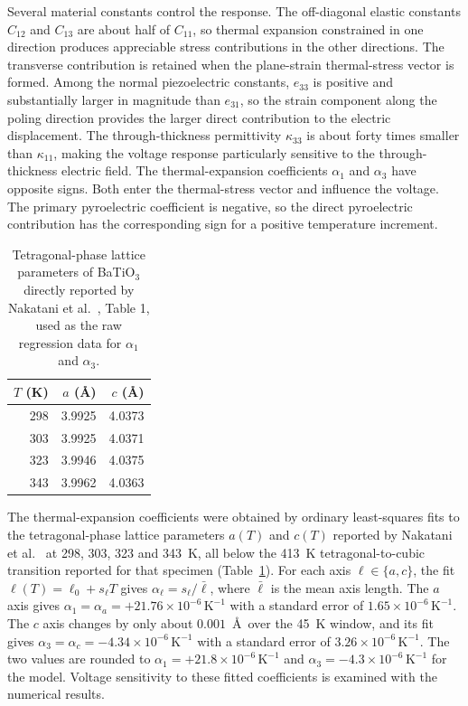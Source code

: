 \documentclass[a4paper,12pt]{elsarticle}
\begin{document}
Several material constants control the response.
The off-diagonal elastic constants $C_{12}$ and $C_{13}$ are about half of $C_{11}$,
so thermal expansion constrained in one direction produces appreciable stress
contributions in the other directions. The transverse contribution is retained when the plane-strain
thermal-stress vector is formed. Among the normal piezoelectric constants, $e_{33}$ is
positive and substantially larger in magnitude than $e_{31}$, so the strain component
along the poling direction provides the larger direct contribution to the electric
displacement. The through-thickness permittivity $\kappa_{33}$ is about forty times
smaller than $\kappa_{11}$, making the voltage response particularly sensitive to the
through-thickness electric field. The thermal-expansion coefficients $\alpha_1$ and $\alpha_3$ have opposite
signs. Both enter the thermal-stress vector and influence the voltage. The
primary pyroelectric coefficient is negative, so the direct pyroelectric contribution
has the corresponding sign for a positive temperature increment.

\begin{table}[t]
\centering
\caption{Tetragonal-phase lattice parameters of BaTiO$_3$ directly reported by
Nakatani et al.~\cite{Nakatani2016}, Table 1, used as the raw regression data for
$\alpha_1$ and $\alpha_3$.}
\label{tab:nakatani-raw}
\begin{tabular}{@{}rrr@{}}
\toprule
$T$ (K) & $a$ (\AA) & $c$ (\AA) \\
\midrule
298 & 3.9925 & 4.0373 \\
303 & 3.9925 & 4.0371 \\
323 & 3.9946 & 4.0375 \\
343 & 3.9962 & 4.0363 \\
\bottomrule
\end{tabular}
\end{table}

The thermal-expansion coefficients were obtained by ordinary least-squares fits to the
tetragonal-phase lattice parameters $a(T)$ and $c(T)$ reported by Nakatani et al.~\cite{Nakatani2016} at 298, 303, 323 and 343~K, all below the 413~K
tetragonal-to-cubic transition reported for that specimen
(Table~\ref{tab:nakatani-raw}). For each axis $\ell\in\{a,c\}$, the fit
$\ell(T)=\ell_0+s_\ell T$ gives $\alpha_\ell=s_\ell/\bar\ell$, where $\bar\ell$ is the
mean axis length. The $a$ axis gives
$\alpha_1=\alpha_a=+21.76\times10^{-6}\,\text{K}^{-1}$ with a standard error of
$1.65\times10^{-6}\,\text{K}^{-1}$. The $c$ axis changes by only about $0.001$~\AA\
over the 45~K window, and its fit gives
$\alpha_3=\alpha_c=-4.34\times10^{-6}\,\text{K}^{-1}$ with a standard error of
$3.26\times10^{-6}\,\text{K}^{-1}$. The two values are rounded to
$\alpha_1=+21.8\times10^{-6}\,\text{K}^{-1}$ and
$\alpha_3=-4.3\times10^{-6}\,\text{K}^{-1}$ for the model. Voltage sensitivity to these fitted coefficients is examined with the numerical results.
\end{document}

